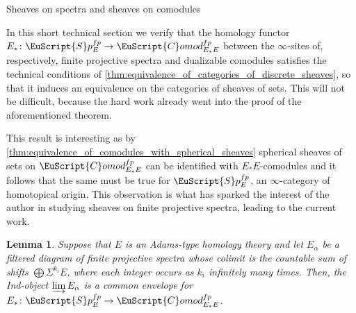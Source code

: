 \documentclass[oneside,a4paper]{amsart}
\makeatletter
\newcommand{\euscr}[1]{\EuScript{#1}} %
\newcommand{\spectra}{\euscr{S}p} %
\newcommand{\spectrafp}{\spectra_{E}^{fp}} %
\newcommand{\Comod}{\euscr{C}omod} %
\newcommand{\ComodE}{\Comod_{E_{*}E}} %
\theoremstyle{plain}
\newtheorem{lemma}[thm]{Lemma}
\theoremstyle{definition}
\theoremstyle{remark}
\def\subsection{\@startsection{subsection}{1}%
  \z@{.7\linespacing\@plus\linespacing}{.5\linespacing}%
  {\normalfont\bfseries\centering}}%
\makeatother
\begin{document}
\subsection{Sheaves on spectra and sheaves on comodules}

In this short technical section we verify that the homology functor $E_{*} \colon \spectra_{E}^{fp} \rightarrow \ComodE^{fp}$ between the $\infty$-sites of, respectively, finite projective spectra and dualizable comodules satisfies the technical conditions of \cref{thm:equivalence_of_categories_of_discrete_sheaves}, so that it induces an equivalence on the categories of sheaves of sets. This will not be difficult, because the hard work already went into the proof of the aforementioned theorem. 

This result is interesting as by \cref{thm:equivalence_of_comodules_with_spherical_sheaves} spherical sheaves of sets on $\ComodE^{fp}$ can be identified with $E_{*}E$-comodules and it follows that the same must be true for $\spectrafp$, an $\infty$-category of homotopical origin. This observation is what has sparked the interest of the author in studying sheaves on finite projective spectra, leading to the current work. 

\begin{lemma}
\label{lemma:countable_sum_of_cofree_comodules_is_a_common_envelope}
Suppose that $E$ is an Adams-type homology theory and let $E_{\alpha}$ be a filtered diagram of finite projective spectra whose colimit is the countable sum of shifts $\bigoplus \Sigma^{k_{i}} E$, where each integer occurs as $k_{i}$ infinitely many times. Then, the Ind-object $\varinjlim E_{\alpha}$ is a common envelope for $E_{*} \colon \spectrafp \rightarrow \ComodE^{fp}$.
\end{lemma}
\end{document}
